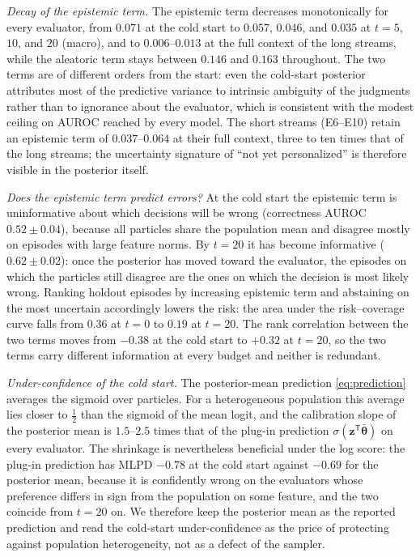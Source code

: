 \documentclass[lettersize,journal]{IEEEtran}
\newcommand{\sigmoid}{\sigma}
\newcommand{\T}{\mathsf{T}}
\begin{document}
\emph{Decay of the epistemic term.} The epistemic term decreases monotonically for every evaluator, from $0.071$ at the cold start to $0.057$, $0.046$, and $0.035$ at $t=5$, $10$, and $20$ (macro), and to $0.006$--$0.013$ at the full context of the long streams, while the aleatoric term stays between $0.146$ and $0.163$ throughout. The two terms are of different orders from the start: even the cold-start posterior attributes most of the predictive variance to intrinsic ambiguity of the judgments rather than to ignorance about the evaluator, which is consistent with the modest ceiling on AUROC reached by every model. The short streams (E6--E10) retain an epistemic term of $0.037$--$0.064$ at their full context, three to ten times that of the long streams; the uncertainty signature of ``not yet personalized'' is therefore visible in the posterior itself.

\emph{Does the epistemic term predict errors?} At the cold start the epistemic term is uninformative about which decisions will be wrong (correctness AUROC $0.52\pm0.04$), because all particles share the population mean and disagree mostly on episodes with large feature norms. By $t=20$ it has become informative ($0.62\pm0.02$): once the posterior has moved toward the evaluator, the episodes on which the particles still disagree are the ones on which the decision is most likely wrong. Ranking holdout episodes by increasing epistemic term and abstaining on the most uncertain accordingly lowers the risk: the area under the risk--coverage curve falls from $0.36$ at $t=0$ to $0.19$ at $t=20$. The rank correlation between the two terms moves from $-0.38$ at the cold start to $+0.32$ at $t=20$, so the two terms carry different information at every budget and neither is redundant.

\emph{Under-confidence of the cold start.} The posterior-mean prediction \eqref{eq:prediction} averages the sigmoid over particles. For a heterogeneous population this average lies closer to $\tfrac12$ than the sigmoid of the mean logit, and the calibration slope of the posterior mean is $1.5$--$2.5$ times that of the plug-in prediction $\sigmoid(\bm z^{\T}\bar{\bm\theta})$ on every evaluator. The shrinkage is nevertheless beneficial under the log score: the plug-in prediction has MLPD $-0.78$ at the cold start against $-0.69$ for the posterior mean, because it is confidently wrong on the evaluators whose preference differs in sign from the population on some feature, and the two coincide from $t=20$ on. We therefore keep the posterior mean as the reported prediction and read the cold-start under-confidence as the price of protecting against population heterogeneity, not as a defect of the sampler.
\end{document}
